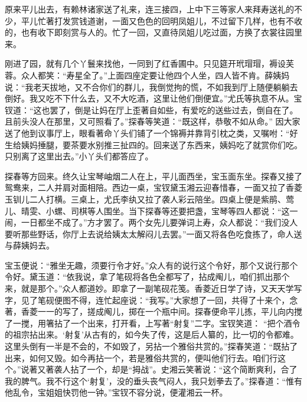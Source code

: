 \begin{parag}
    原来平儿出去，有赖林诸家送了礼来，连三接四，上中下三等家人来拜寿送礼的不少，平儿忙著打发赏钱道谢，一面又色色的回明凤姐儿，不过留下几样，也有不收的，也有收下即刻赏与人的。忙了一回，又直待凤姐儿吃过面，方换了衣裳往园里来。
\end{parag}


\begin{parag}
    刚进了园，就有几个丫鬟来找他，一同到了红香圃中。只见筵开玳瑁瑁，褥设芙蓉。众人都笑：“寿星全了。”上面四座定要让他四个人坐，四人皆不肯。薛姨妈说：“我老天拔地，又不合你们的群儿，我倒觉拘的慌，不如我到厅上随便躺躺去倒好。我又吃不下什么去，又不大吃酒，这里让他们倒便宜。”尤氏等执意不从。宝钗道：“这也罢了，倒是让妈在厅上歪著自如些，有爱吃的送些过去，倒自在了。且前头没人在那里，又可照看了。”探春等笑道：“既这样，恭敬不如从命。” 因大家送了他到议事厅上，眼看著命丫头们铺了一个锦褥并靠背引枕之类，又嘱咐：“好生给姨妈捶腿，要茶要水别推三扯四的。回来送了东西来，姨妈吃了就赏你们吃。只别离了这里出去。”小丫头们都答应了。
\end{parag}


\begin{parag}
    探春等方回来。终久让宝琴岫烟二人在上，平儿面西坐，宝玉面东坐。探春又接了鸳鸯来，二人并肩对面相陪。西边一桌，宝钗黛玉湘云迎春惜春，一面又拉了香菱玉钏儿二人打横。三桌上，尤氏李纨又拉了袭人彩云陪坐。四桌上便是紫鹃、莺儿、晴雯、小螺、司棋等人围坐。当下探春等还要把盏，宝琴等四人都说：“这一闹，一日都坐不成了。”方才罢了。两个女先儿要弹词上寿，众人都说：“我们没人要听那些野话，你厅上去说给姨太太解闷儿去罢。”一面又将各色吃食拣了，命人送与薛姨妈去。
\end{parag}


\begin{parag}
    宝玉便说：“雅坐无趣，须要行令才好。”众人有的说行这个令好，那个又说行那个令好。黛玉道：“依我说，拿了笔砚将各色全都写了，拈成阄儿，咱们抓出那个来，就是那个。”众人都道妙。即拿了一副笔砚花笺。香菱近日学了诗，又天天学写字，见了笔砚便图不得，连忙起座说：“我写。”大家想了一回，共得了十来个，念著，香菱一一的写了，搓成阄儿，掷在一个瓶中间。探春便命平儿拣，平儿向内搅了一搅，用箸拈了一个出来，打开看，上写著“射复”二字。宝钗笑道： “把个酒令的祖宗拈出来。‘射复’从古有的，如今失了传，这是后人纂的，比一切的令都难。这里头倒有一半是不会的，不如毁了，另拈一个雅俗共赏的。”探春笑道：“既拈了出来，如何又毁。如今再拈一个，若是雅俗共赏的，便叫他们行去。咱们行这个。”说著又著袭人拈了一个，却是“拇战”。史湘云笑著说：“这个简断爽利，合了我的脾气。我不行这个‘射复’，没的垂头丧气闷人，我只划拳去了。”探春道：“惟有他乱令，宝姐姐快罚他一钟。”宝钗不容分说，便灌湘云一杯。
\end{parag}


